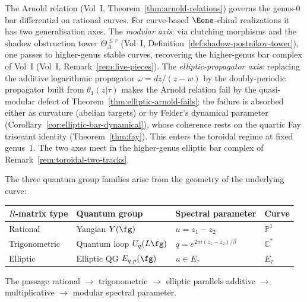 \begin{remark}
\label{rem:arnold-fay-generalization}
The Arnold relation (Vol~I, Theorem~\ref{thm:arnold-relations}) governs the genus-$0$ bar differential on rational curves. For curve-based $\Eone$-chiral realizations it has two generalisation axes. The \emph{modular axis}: via clutching morphisms and the shadow obstruction tower $\Theta_A^{\leq r}$ (Vol~I, Definition~\ref{def:shadow-postnikov-tower}), one passes to higher-genus stable curves, recovering the higher-genus bar complex of Vol~I (Vol~I, Remark~\ref{rem:five-pieces}). The \emph{elliptic-propagator axis}: replacing the additive logarithmic propagator $\omega = dz/(z-w)$ by the doubly-periodic propagator built from $\theta_1(z|\tau)$ makes the Arnold relation fail by the quasi-modular defect of Theorem~\ref{thm:elliptic-arnold-fails}; the failure is absorbed either as curvature (abelian targets) or by Felder's dynamical parameter (Corollary~\ref{cor:elliptic-bar-dynamical}), whose coherence rests on the quartic Fay trisecant identity (Theorem~\ref{thm:fay}). This enters the toroidal regime at fixed genus~$1$. The two axes meet in the higher-genus elliptic bar complex of Remark~\ref{rem:toroidal-two-tracks}.
\end{remark}

\begin{remark}
\label{rem:rational-trig-elliptic}
The three quantum group families arise from the geometry of the underlying curve:
\begin{center}
\small
\begin{tabular}{llll}
\textbf{$R$-matrix type} & \textbf{Quantum group} &
 \textbf{Spectral parameter} & \textbf{Curve} \\ \hline
Rational
 & Yangian $Y(\fg)$
 & $u = z_1 - z_2$
 & $\mathbb{P}^1$ \\[2pt]
Trigonometric
 & Quantum loop $U_q(L\fg)$
 & $q = e^{2\pi i(z_1 - z_2)/\beta}$
 & $\mathbb{C}^*$ \\[2pt]
Elliptic
 & Elliptic QG $E_{q,p}(\fg)$
 & $u \in E_\tau$
 & $E_\tau$
\end{tabular}
\end{center}
The passage rational $\to$ trigonometric $\to$ elliptic parallels additive $\to$ multiplicative $\to$ modular spectral parameter.
\end{remark}

